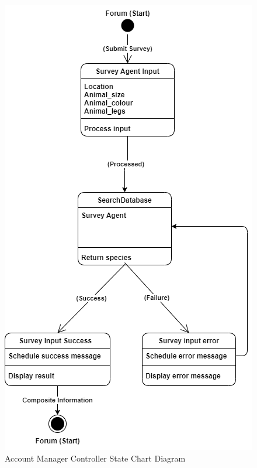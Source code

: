 \documentclass[]{article}
\numberwithin{figure}{section}
\begin{document}
\clearpage 
\begin{figure}[h]
    \centering
    \includegraphics[scale=0.8]{Survey_Agents.png}
    \caption{Account Manager Controller State Chart Diagram}
    \label{fig:account_manager_controller}
\end{figure}
\clearpage 
\end{document}
